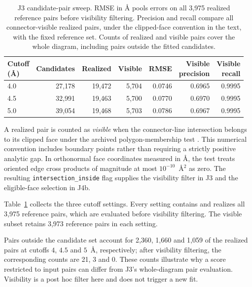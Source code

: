 \begin{table}[htbp]
\centering
\footnotesize
\setlength{\tabcolsep}{3.5pt}
\caption{J3 candidate-pair sweep. RMSE in \AA{} pools errors on all 3,975 realized reference pairs before visibility filtering. Precision and recall compare all connector-visible realized pairs, under the clipped-face convention in the text, with the fixed reference set. Counts of realized and visible pairs cover the whole diagram, including pairs outside the fitted candidates.}
\label{tab:molecular-candidates}
\begin{tabular}{@{}lrrrrrr@{}}
\toprule
\shortstack{Cutoff\\(\AA)} & Candidates & Realized & Visible & RMSE & \shortstack{Visible\\precision} & \shortstack{Visible\\recall} \\
\midrule
4.0 & 27,178 & 19,472 & 5,704 & 0.0746 & 0.6965 & 0.9995 \\
4.5 & 32,991 & 19,463 & 5,700 & 0.0770 & 0.6970 & 0.9995 \\
5.0 & 39,054 & 19,468 & 5,703 & 0.0786 & 0.6967 & 0.9995 \\
\bottomrule
\end{tabular}
\end{table}

A realized pair is counted as \emph{visible} when the connector-line intersection belongs to its clipped face under the archived polygon-membership test \citep{Pyvoro2_063}. This numerical convention includes boundary points rather than requiring a strictly positive analytic gap. In orthonormal face coordinates measured in \AA{}, the test treats oriented edge cross products of magnitude at most $10^{-10}$~\AA$^2$ as zero. The resulting \texttt{intersection\_inside} flag supplies the visibility filter in J3 and the eligible-face selection in J4b.

Table~\ref{tab:molecular-candidates} collects the three cutoff settings. Every setting contains and realizes all 3,975 reference pairs, which are evaluated before visibility filtering. The visible subset retains 3,973 reference pairs in each setting.

Pairs outside the candidate set account for 2,360, 1,660 and 1,059 of the realized pairs at cutoffs $4$, $4.5$ and $5$~\AA{}, respectively; after visibility filtering, the corresponding counts are 21, 3 and 0. These counts illustrate why a score restricted to input pairs can differ from J3's whole-diagram pair evaluation. Visibility is a post hoc filter here and does not trigger a new fit.

